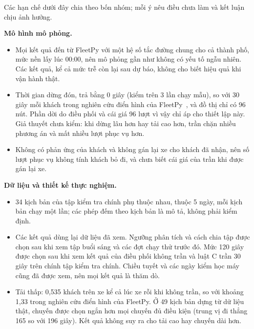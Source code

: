 Các hạn chế dưới đây chia theo bốn nhóm; mỗi ý nêu điều chưa làm và kết luận chịu ảnh hưởng.

\textbf{Mô hình mô phỏng.}
\begin{itemize}[leftmargin=1.2cm,itemsep=2pt,topsep=3pt]
\item Mọi kết quả đến từ FleetPy với một hệ số tắc đường chung cho cả thành phố, mức nền lấy lúc 00:00, nên mô phỏng gần
như không có yếu tố ngẫu nhiên. Các kết quả, kể cả mức trễ còn lại sau dự báo, không cho biết hiệu quả khi vận hành thật.
\item Thời gian dừng đón, trả bằng 0 giây (kiểm trên 3 lần chạy mẫu), so với 30 giây mỗi khách trong nghiên cứu điển hình
của FleetPy~\cite{engelhardt2026}, và đồ thị chỉ có 96 nút. Phần dời do điều phối và cái giá 96 lượt vì vậy chỉ áp cho
thiết lập này. Giả thuyết chưa kiểm: khi dừng lâu hơn hay tải cao hơn, trần chặn nhiều phương án và mất nhiều lượt phục
vụ hơn.
\item Không có phản ứng của khách và không gán lại xe cho khách đã nhận, nên số lượt phục vụ không tính khách bỏ đi, và
chưa biết cái giá của trần khi được gán lại xe.
\end{itemize}

\textbf{Dữ liệu và thiết kế thực nghiệm.}
\begin{itemize}[leftmargin=1.2cm,itemsep=2pt,topsep=3pt]
\item 34 kịch bản của tập kiểm tra chính phụ thuộc nhau, thuộc 5 ngày, mỗi kịch bản chạy một lần; các phép đếm theo
kịch bản là mô tả, không phải kiểm định.
\item Các kết quả dùng lại dữ liệu đã xem. Ngưỡng phân tích và cách chia tập được chọn sau khi xem tập buổi sáng và các
đợt chạy thử trước đó. Mức 120 giây được chọn sau khi xem kết quả của điều phối không trần và luật C trần 30 giây trên
chính tập kiểm tra chính. Chiều tuyết và các ngày kiểm học máy cũng đã được xem, nên mọi kết quả là thăm dò.
\item Tải thấp: 0,535 khách trên xe kể cả lúc xe rỗi khi không trần, so với khoảng 1,33 trong nghiên cứu điển hình của
FleetPy. Ở 49 kịch bản dựng từ dữ liệu thật, chuyến được chọn ngắn hơn mọi chuyến đủ điều kiện (trung vị đi thẳng 165 so
với 196 giây). Kết quả không suy ra cho tải cao hay chuyến dài hơn.
\end{itemize}

